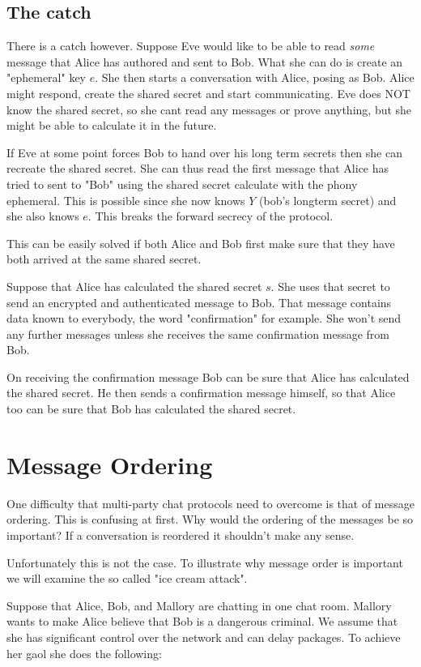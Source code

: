 \subsection{The catch}

There is a catch however. Suppose Eve would like to be able to read \emph{some} message that Alice has authored and sent to Bob.
What she can do is create an "ephemeral" key $e$.
She then starts a conversation with Alice, posing as Bob.
Alice might respond, create the shared secret and start communicating.
Eve does NOT know the shared secret, so she cant read any messages or prove anything, but she might be able to calculate it in the future.

If Eve at some point forces Bob to hand over his long term secrets then she can recreate the shared secret.
She can thus read the first message that Alice has tried to sent to "Bob" using the shared secret calculate with the phony ephemeral.
This is possible since she now knows $Y$ (bob's longterm secret) and she also knows $e$.
This breaks the forward secrecy of the protocol.

This can be easily solved if both Alice and Bob first make sure that they have both arrived at the same shared secret.

Suppose that Alice has calculated the shared secret $s$. She uses that secret to send an encrypted and authenticated message to Bob.
That message contains data known to everybody, the word "confirmation" for example.
She won't send any further messages unless she receives the same confirmation message from Bob.

On receiving the confirmation message Bob can be sure that Alice has calculated the shared secret.
He then sends a confirmation message himself, so that Alice too can be sure that Bob has calculated the shared secret.

\section{Message Ordering}

One difficulty that multi-party chat protocols need to overcome is that of message ordering.
This is confusing at first.
Why would the ordering of the messages be so important?
If a conversation is reordered it shouldn't make any sense.

Unfortunately this is not the case.
To illustrate why message order is important we will examine the so called "ice cream attack".

Suppose that Alice, Bob, and Mallory are chatting in one chat room.
Mallory wants to make Alice believe that Bob is a dangerous criminal.
We assume that she has significant control over the network and can delay packages.
To achieve her gaol she does the following:

